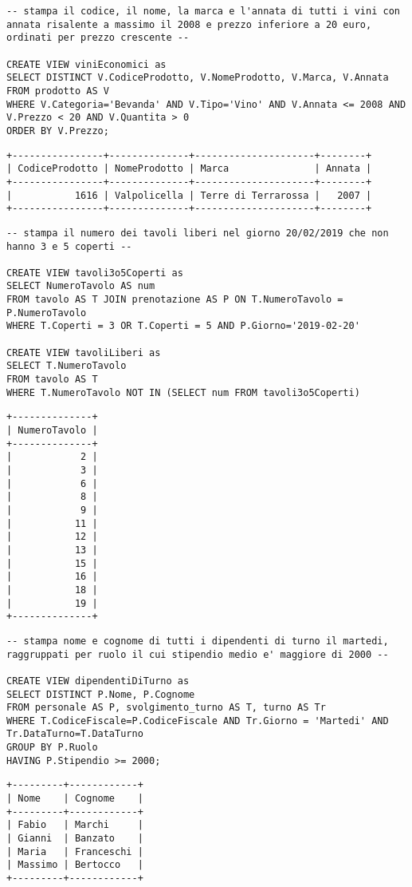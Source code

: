 \begin{lstlisting}[title=Operazione 8, style=mysqlStyle]
-- stampa il codice, il nome, la marca e l'annata di tutti i vini con annata risalente a massimo il 2008 e prezzo inferiore a 20 euro, ordinati per prezzo crescente --

CREATE VIEW viniEconomici as
SELECT DISTINCT V.CodiceProdotto, V.NomeProdotto, V.Marca, V.Annata
FROM prodotto AS V
WHERE V.Categoria='Bevanda' AND V.Tipo='Vino' AND V.Annata <= 2008 AND V.Prezzo < 20 AND V.Quantita > 0
ORDER BY V.Prezzo;
\end{lstlisting}
\begin{lstlisting}[basicstyle=\ttfamily\footnotesize]
+----------------+--------------+---------------------+--------+  
| CodiceProdotto | NomeProdotto | Marca               | Annata |  
+----------------+--------------+---------------------+--------+  
|           1616 | Valpolicella | Terre di Terrarossa |   2007 |  
+----------------+--------------+---------------------+--------+  
\end{lstlisting}
\begin{lstlisting}[title=Operazione 9, style=mysqlStyle]
-- stampa il numero dei tavoli liberi nel giorno 20/02/2019 che non hanno 3 e 5 coperti --

CREATE VIEW tavoli3o5Coperti as
SELECT NumeroTavolo AS num
FROM tavolo AS T JOIN prenotazione AS P ON T.NumeroTavolo = P.NumeroTavolo
WHERE T.Coperti = 3 OR T.Coperti = 5 AND P.Giorno='2019-02-20'

CREATE VIEW tavoliLiberi as
SELECT T.NumeroTavolo
FROM tavolo AS T
WHERE T.NumeroTavolo NOT IN (SELECT num FROM tavoli3o5Coperti) 
\end{lstlisting}
\begin{lstlisting}[basicstyle=\ttfamily\footnotesize]
+--------------+  
| NumeroTavolo |  
+--------------+  
|            2 |  
|            3 |  
|            6 |  
|            8 |  
|            9 |  
|           11 |  
|           12 |  
|           13 |  
|           15 |  
|           16 |  
|           18 |  
|           19 |  
+--------------+  
\end{lstlisting}
\begin{lstlisting}[title=Operazione 10, style=mysqlStyle]
-- stampa nome e cognome di tutti i dipendenti di turno il martedi, raggruppati per ruolo il cui stipendio medio e' maggiore di 2000 --

CREATE VIEW dipendentiDiTurno as
SELECT DISTINCT P.Nome, P.Cognome
FROM personale AS P, svolgimento_turno AS T, turno AS Tr
WHERE T.CodiceFiscale=P.CodiceFiscale AND Tr.Giorno = 'Martedi' AND Tr.DataTurno=T.DataTurno
GROUP BY P.Ruolo
HAVING P.Stipendio >= 2000;
\end{lstlisting}
\begin{lstlisting}[basicstyle=\ttfamily\footnotesize]
+---------+------------+  
| Nome    | Cognome    |  
+---------+------------+  
| Fabio   | Marchi     |  
| Gianni  | Banzato    |  
| Maria   | Franceschi |  
| Massimo | Bertocco   |  
+---------+------------+  
\end{lstlisting}

